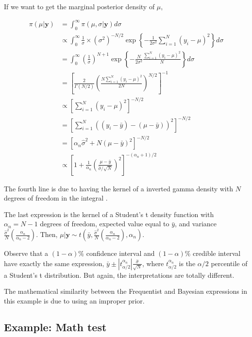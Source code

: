 If we want to get the marginal posterior density of $\mu$, 

\begin{align*}
	\pi(\mu|\mathbf{y})&=\int_{0}^{\infty} \pi(\mu,\sigma|\mathbf{y}) d\sigma\\
	&\propto \int_{0}^{\infty} \frac{1}{\sigma}\times (\sigma^2)^{-N/2}\exp\left\{-\frac{1}{2\sigma^2}\sum_{i=1}^N (y_i-\mu)^2\right\} d\sigma\\ 
	&= \int_{0}^{\infty} \left(\frac{1}{\sigma}\right)^{N+1} \exp\left\{-\frac{N}{2\sigma^2}\frac{\sum_{i=1}^N (y_i-\mu)^2}{N}\right\} d\sigma\\
	&=\left[\frac{2}{\Gamma(N/2)}\left(\frac{N\sum_{i=1}^N (y_i-\mu)^2}{2N}\right)^{N/2}\right]^{-1}\\
	&\propto \left[\sum_{i=1}^N (y_i-\mu)^2\right]^{-N/2}\\
	&=\left[\sum_{i=1}^N ((y_i-\bar{y})-(\mu-\bar{y}))^2\right]^{-N/2}\\
	&=[\alpha_n\hat{\sigma}^2+N(\mu-\bar{y})^2]^{-N/2}\\
	&\propto \left[1+\frac{1}{\alpha_n}\left(\frac{\mu-\bar{y}}{\hat{\sigma}/\sqrt{N}}\right)^2\right]^{-(\alpha_n+1)/2}
\end{align*}

The fourth line is due to having the kernel of a inverted gamma density with $N$ degrees of freedom in the integral \cite{zellner1996introduction}.

The last expression is the kernel of a Student's t density function with $\alpha_n=N-1$ degrees of freedom, expected value equal to $\bar{y}$, and variance $\frac{\hat{\sigma}^2}{N}\left(\frac{\alpha_n}{\alpha_n-2}\right)$. Then, $\mu|\mathbf{y}\sim t\left(\bar{y},\frac{\hat{\sigma}^2}{N}\left(\frac{\alpha_n}{\alpha_n-2}\right),\alpha_n\right)$.

Observe that a $(1-\alpha)\%$ confidence interval and $(1-\alpha)\%$ credible interval have exactly the same expression, $\bar{y}\pm |t_{\alpha/2}^{\alpha_n}|\frac{\hat{\sigma}}{\sqrt{N}}$, where $t_{\alpha/2}^{\alpha_n}$ is the $\alpha/2$ percentile of a Student's t distribution. But again, the interpretations are totally different.

The mathematical similarity between the Frequentist and Bayesian expressions in this example is due to using an improper prior.

\subsection{Example: Math test}\label{sec261}

